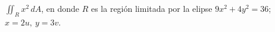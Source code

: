\item $\iint_R x^2 \, dA$, en donde $R$ es la región limitada por la elipse $9x^2 + 4y^2 = 36$; $x = 2u, \ y = 3v$.
